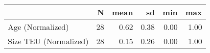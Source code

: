 
\begin{tabular}[t]{lrrrrr}
\toprule
  & N & mean & sd & min & max\\
\midrule
Age (Normalized) & 28 & 0.62 & 0.38 & 0.00 & 1.00\\
Size TEU (Normalized) & 28 & 0.15 & 0.26 & 0.00 & 1.00\\
\bottomrule
\end{tabular}
